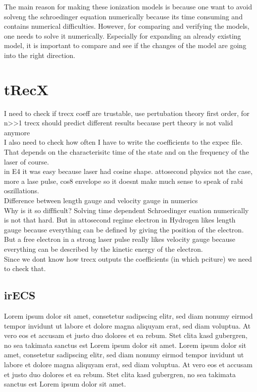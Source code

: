 The main reason for making these ionization models is because one want to avoid solveng the schroedinger equation numerically because its time consuming and contains numerical difficulties.
However, for comparing and verifying the models, one needs to solve it numerically.
Especially for expanding an already existing model, it is important to compare and see if the changes of the model are going into the right direction.



\section{tRecX}
I need to check if trecx coeff are trustable, use pertubation theory first order, for n>>1 trecx should predict different results because pert theory is not valid anymore\\
I also need to check how often I have to write the coefficients to the expec file. That depends on the characterisitc time of the state and on the frequency of the laser of course.\\
in E4 it was easy because laser had cosine shape. attosecond physics not the case, more a lase pulse, cos8 envelope so it doesnt make much sense to speak of rabi oszillations.\\
Difference between length gauge and velocity gauge in numerics\\
Why is it so diffficult? Solving time dependent Schroedinger euation numerically is not that hard. But in attosecond regime electron in Hydrogen likes length gauge because everything can be defined by giving the position of the electron. 
But a free electron in a strong laser pulse really likes velocity gauge because everything can be described by the kinetic energy of the electron.\\
Since we dont know how trecx outputs the coefficients (in which pciture) we need to check that.
\subsection{irECS}
Lorem ipsum dolor sit amet, consetetur sadipscing elitr, sed diam nonumy eirmod tempor invidunt ut labore et dolore magna aliquyam erat, sed diam voluptua. At vero eos et accusam et justo duo dolores et ea rebum. Stet clita kasd gubergren, no sea takimata sanctus est Lorem ipsum dolor sit amet. Lorem ipsum dolor sit amet, consetetur sadipscing elitr, sed diam nonumy eirmod tempor invidunt ut labore et dolore magna aliquyam erat, sed diam voluptua. At vero eos et accusam et justo duo dolores et ea rebum. Stet clita kasd gubergren, no sea takimata sanctus est Lorem ipsum dolor sit amet.
